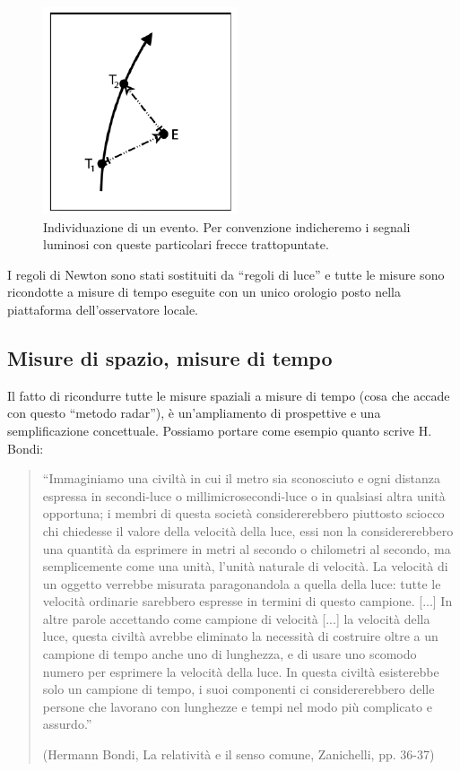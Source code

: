 \begin{figure}[htbp]
   \centering
   \includegraphics[scale=1]{immagini/minkowski/radar1}
   \caption{\label{radar1} Individuazione di un evento. Per convenzione indicheremo i segnali luminosi con queste particolari frecce trattopuntate.}
\end{figure}

I regoli di Newton sono stati sostituiti da ``regoli di luce'' e tutte le misure
sono ricondotte a misure di tempo eseguite con un unico orologio posto nella
piattaforma dell'osservatore locale.

\subsection{Misure di spazio, misure di tempo}
Il fatto di ricondurre tutte le misure spaziali a misure di tempo (cosa che
accade con questo ``metodo radar''), è un'ampliamento di prospettive e una
semplificazione concettuale. Possiamo portare come esempio quanto scrive
H. Bondi:
\begin{quote}
``Immaginiamo una civiltà in cui il metro sia sconosciuto e ogni distanza espressa in secondi-luce o 
millimicrosecondi-luce o in qualsiasi altra unità opportuna; i membri di questa società considererebbero
piuttosto sciocco chi chiedesse il valore della velocità della luce, essi
non la considererebbero una quantità da esprimere in metri al secondo
o chilometri al secondo, ma semplicemente come una unità, l'unità
naturale di velocità. La velocità di un oggetto verrebbe misurata paragonandola 
a quella della luce: tutte le velocità ordinarie sarebbero
espresse in termini di questo campione. [...] In altre parole accettando 
come campione di velocità [...] la velocità della luce, questa
civiltà avrebbe eliminato la necessità di costruire oltre a un campione
di tempo anche uno di lunghezza, e di usare uno scomodo numero per
esprimere la velocità della luce. In questa civiltà esisterebbe solo un
campione di tempo, i suoi componenti ci considererebbero delle persone 
che lavorano con lunghezze e tempi nel modo più complicato e
assurdo.''

(Hermann Bondi, La relatività e il senso comune, Zanichelli, pp. 36-37)
\end{quote}

